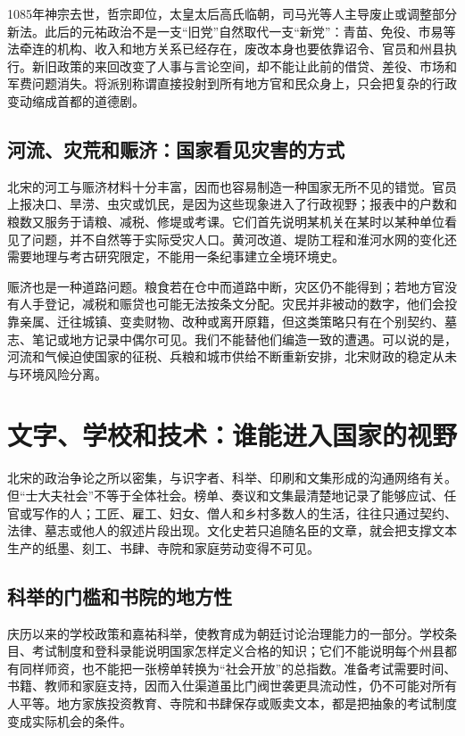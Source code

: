 1085年神宗去世，哲宗即位，太皇太后高氏临朝，司马光等人主导废止或调整部分新法。此后的元祐政治不是一支“旧党”自然取代一支“新党”：青苗、免役、市易等法牵连的机构、收入和地方关系已经存在，废改本身也要依靠诏令、官员和州县执行。新旧政策的来回改变了人事与言论空间，却不能让此前的借贷、差役、市场和军费问题消失。将派别称谓直接投射到所有地方官和民众身上，只会把复杂的行政变动缩成首都的道德剧。

\subsection{河流、灾荒和赈济：国家看见灾害的方式}

北宋的河工与赈济材料十分丰富，因而也容易制造一种国家无所不见的错觉。官员上报决口、旱涝、虫灾或饥民，是因为这些现象进入了行政视野；报表中的户数和粮数又服务于请粮、减税、修堤或考课。它们首先说明某机关在某时以某种单位看见了问题，并不自然等于实际受灾人口。黄河改道、堤防工程和淮河水网的变化还需要地理与考古研究限定，不能用一条纪事建立全境环境史。

赈济也是一种道路问题。粮食若在仓中而道路中断，灾区仍不能得到；若地方官没有人手登记，减税和赈贷也可能无法按条文分配。灾民并非被动的数字，他们会投靠亲属、迁往城镇、变卖财物、改种或离开原籍，但这类策略只有在个别契约、墓志、笔记或地方记录中偶尔可见。我们不能替他们编造一致的遭遇。可以说的是，河流和气候迫使国家的征税、兵粮和城市供给不断重新安排，北宋财政的稳定从未与环境风险分离。

\section{文字、学校和技术：谁能进入国家的视野}

北宋的政治争论之所以密集，与识字者、科举、印刷和文集形成的沟通网络有关。但“士大夫社会”不等于全体社会。榜单、奏议和文集最清楚地记录了能够应试、任官或写作的人；工匠、雇工、妇女、僧人和乡村多数人的生活，往往只通过契约、法律、墓志或他人的叙述片段出现。文化史若只追随名臣的文章，就会把支撑文本生产的纸墨、刻工、书肆、寺院和家庭劳动变得不可见。

\subsection{科举的门槛和书院的地方性}

庆历以来的学校政策和嘉祐科举，使教育成为朝廷讨论治理能力的一部分。学校条目、考试制度和登科录能说明国家怎样定义合格的知识；它们不能说明每个州县都有同样师资，也不能把一张榜单转换为“社会开放”的总指数。准备考试需要时间、书籍、教师和家庭支持，因而入仕渠道虽比门阀世袭更具流动性，仍不可能对所有人平等。地方家族投资教育、寺院和书肆保存或贩卖文本，都是把抽象的考试制度变成实际机会的条件。

